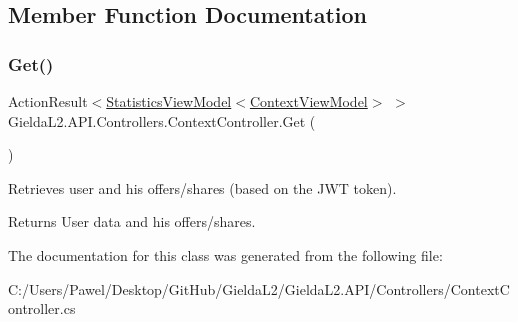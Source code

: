 \subsection{Member Function Documentation}
\mbox{\label{class_gielda_l2_1_1_a_p_i_1_1_controllers_1_1_context_controller_a4b273ae74e0c12a862fd6aa82307fbc9}} 
\subsubsection{\texorpdfstring{Get()}{Get()}}
{\footnotesize\ttfamily Action\+Result$<$\mbox{\hyperlink{class_gielda_l2_1_1_a_p_i_1_1_view_models_1_1_view_1_1_statistics_view_model}{Statistics\+View\+Model}}$<$\mbox{\hyperlink{class_gielda_l2_1_1_a_p_i_1_1_view_models_1_1_view_1_1_context_view_model}{Context\+View\+Model}}$>$ $>$ Gielda\+L2.\+A\+P\+I.\+Controllers.\+Context\+Controller.\+Get (\begin{DoxyParamCaption}{ }\end{DoxyParamCaption})}



Retrieves user and his offers/shares (based on the J\+WT token). 

\begin{DoxyReturn}{Returns}
User data and his offers/shares.
\end{DoxyReturn}


The documentation for this class was generated from the following file\+:\begin{DoxyCompactItemize}
\item 
C\+:/\+Users/\+Pawel/\+Desktop/\+Git\+Hub/\+Gielda\+L2/\+Gielda\+L2.\+A\+P\+I/\+Controllers/Context\+Controller.\+cs\end{DoxyCompactItemize}
